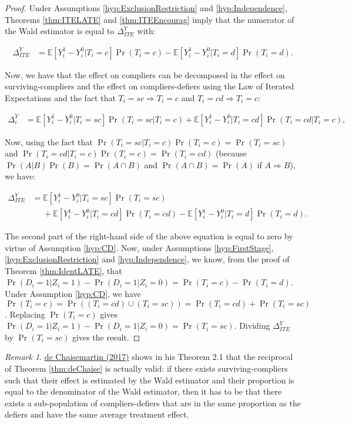 \documentclass[
]{book}
\newcommand{\esp}[1]{\mathbb{E}[ #1 ]}
\theoremstyle{definition}
\theoremstyle{definition}
\theoremstyle{definition}
\theoremstyle{definition}
\theoremstyle{remark}
\newtheorem*{remark}{Remark}
\begin{document}
\begin{proof}
\iffalse{} {Proof. } \fi{}Under Assumptions \ref{hyp:ExclusionRestriction} and \ref{hyp:Independence}, Theorems \ref{thm:ITELATE} and \ref{thm:ITEEncourag} imply that the numerator of the Wald estimator is equal to \(\Delta^Y_{ITE}\) with:

\begin{align*}
  \Delta^Y_{ITE}  & = \esp{Y_i^{1}-Y_i^{0}|T_i=c}\Pr(T_i=c)-\esp{Y_i^{1}-Y_i^{0}|T_i=d}\Pr(T_i=d).
\end{align*}

Now, we have that the effect on compliers can be decomposed in the effect on surviving-compliers and the effect on compliers-defiers using the Law of Iterated Expectations and the fact that \(T_i=sc \Rightarrow T_i=c\) and \(T_i=cd \Rightarrow T_i=c\):

\begin{align*}
\Delta^Y_{c} & = \esp{Y_i^{1}-Y_i^{0}|T_i=sc}\Pr(T_i=sc|T_i=c)+\esp{Y_i^{1}-Y_i^{0}|T_i=cd}\Pr(T_i=cd|T_i=c),
\end{align*}

Now, using the fact that \(\Pr(T_i=sc|T_i=c)\Pr(T_i=c)=\Pr(T_i=sc)\) and \(\Pr(T_i=cd|T_i=c)\Pr(T_i=c)=\Pr(T_i=cd)\) (because \(\Pr(A|B)\Pr(B)=\Pr(A\cap B)\) and \(\Pr(A\cap B)=\Pr(A)\) if \(A \Rightarrow B\)), we have:

\begin{align*}
  \Delta^Y_{ITE} & = \esp{Y_i^{1}-Y_i^{0}|T_i=sc}\Pr(T_i=sc)\\
                & \phantom{=}+\esp{Y_i^{1}-Y_i^{0}|T_i=cd}\Pr(T_i=cd)-\esp{Y_i^{1}-Y_i^{0}|T_i=d}\Pr(T_i=d).
\end{align*}

The second part of the right-hand side of the above equation is equal to zero by virtue of Assumption \ref{hyp:CD}.
Now, under Assumptions \ref{hyp:FirstStage}, \ref{hyp:ExclusionRestriction} and \ref{hyp:Independence}, we know, from the proof of Theorem \ref{thm:IdentLATE}, that \(\Pr(D_i=1|Z_i=1)-\Pr(D_i=1|Z_i=0)=\Pr(T_i=c)-\Pr(T_i=d)\).
Under Assumption \ref{hyp:CD}, we have \(\Pr(T_i=c)=\Pr((T_i=cd)\cup(T_i=sc))=\Pr(T_i=cd)+\Pr(T_i=sc)\).
Replacing \(\Pr(T_i=c)\) gives \(\Pr(D_i=1|Z_i=1)-\Pr(D_i=1|Z_i=0)=\Pr(T_i=sc)\).
Dividing \(\Delta^Y_{ITE}\) by \(\Pr(T_i=sc)\) gives the result.
\end{proof}

\begin{remark}
\iffalse{} {Remark. } \fi{}\href{https://drive.google.com/file/d/16XWlDECIvreM7l_NHe-JkXgyuPhFT1QG/view}{de Chaisemartin (2017)} shows in his Theorem 2.1 that the reciprocal of Theorem \ref{thm:deChaise} is actually valid: if there exists surviving-compliers such that their effect is estimated by the Wald estimator and their proportion is equal to the denominator of the Wald estimator, then it has to be that there exists a sub-population of compliers-defiers that are in the same proportion as the defiers and have the same average treatment effect.
\end{remark}
\end{document}

